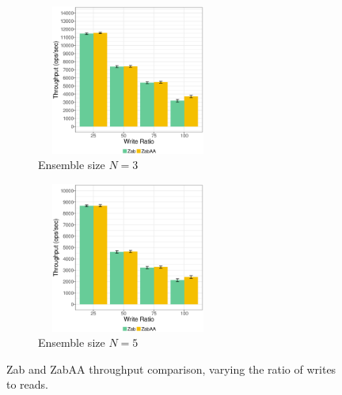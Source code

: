 \documentclass[a4paper,UKenglish]{oasics-v2016}
\begin{document}
\begin{figure}[h]
	\begin{subfigure}{.5\linewidth}
		\includegraphics[width=170pt,height=140pt, scale=0.39]{figuress/TN3_AA.eps}
		\caption{Ensemble size $N=3$}
		\label{ThroughputAAN3}
	\end{subfigure}		
	\begin{subfigure}{.5\linewidth}
		\includegraphics[width=170pt,height=140pt, scale=0.39]{figuress/TN5_AA.eps}
		\caption{Ensemble size $N=5$}
		\label{ThroughputAAN5}
	\end{subfigure}		
	\caption{Zab and ZabAA throughput comparison, varying the ratio of writes to reads.}
	\label{latency comparisonN5}
\end{figure}

\end{document}
